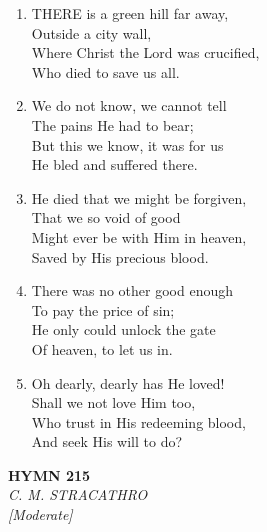 \begin{enumerate}
    \item THERE is a green hill far away, \\
            Outside a city wall, \\
        Where Christ the Lord was crucified, \\
            Who died to save us all.

    \item We do not know, we cannot tell \\
            The pains He had to bear; \\
        But this we know, it was for us \\
            He bled and suffered there.

    \item He died that we might be forgiven, \\
            That we so void of good \\
        Might ever be with Him in heaven, \\
            Saved by His precious blood.

    \item There was no other good enough \\
            To pay the price of sin; \\
        He only could unlock the gate \\
            Of heaven, to let us in.

    \item Oh dearly, dearly has He loved! \\
            Shall we not love Him too, \\
        Who trust in His redeeming blood, \\
            And seek His will to do?

\end{enumerate}

\newpage
\begin{center}
    {\Large \textbf{HYMN 215}}
    \\
    \textit{C. M. STRACATHRO}
    \\
    \textit{\small [Moderate]}
\end{center}
\vspace{1em}

